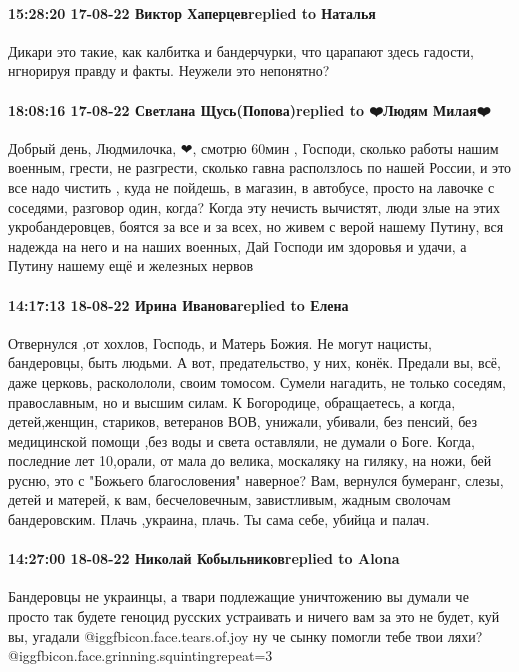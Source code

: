 \paragraph{15:28:20 17-08-22 Виктор Хаперцевreplied to Наталья}

Дикари это такие, как калбитка и бандерчурки, что царапают здесь гадости, нгнорируя правду и факты.
Неужели это непонятно?

\paragraph{18:08:16 17-08-22 Светлана Щусь(Попова)replied to ❤️Людям Милая❤️}

Добрый день, Людмилочка, ❤, смотрю 60мин , Господи, сколько работы нашим
военным, грести, не разгрести, сколько гавна расползлось по нашей России, и это
все надо чистить , куда не пойдешь, в магазин, в автобусе, просто на лавочке с
соседями, разговор один, когда? Когда эту нечисть вычистят, люди злые на этих
укробандеровцев, боятся за все и за всех, но живем с верой нашему Путину, вся
надежда на него и на наших военных, Дай Господи им здоровья и удачи, а Путину
нашему ещё и железных нервов

\paragraph{14:17:13 18-08-22 Ирина Ивановаreplied to Елена}

Отвернулся ,от хохлов, Господь, и Матерь Божия. Не могут нацисты, бандеровцы,
быть людьми. А вот, предательство, у них, конёк. Предали вы, всё, даже церковь,
расколололи, своим томосом. Сумели нагадить, не только соседям, православным,
но и высшим силам. К Богородице, обращаетесь, а когда, детей,женщин, стариков,
ветеранов ВОВ, унижали, убивали, без пенсий, без медицинской помощи ,без воды и
света оставляли, не думали о Боге. Когда, последние лет 10,орали, от мала до
велика, москаляку на гиляку, на ножи, бей русню, это с "Божьего благословения"
наверное? Вам, вернулся бумеранг, слезы, детей и матерей, к вам, бесчеловечным,
завистливым, жадным сволочам бандеровским. Плачь ,украина, плачь. Ты сама себе,
убийца и палач.

\paragraph{14:27:00 18-08-22 Николай Кобыльниковreplied to Alona}

Бандеровцы не украинцы, а твари подлежащие уничтожению вы думали че просто так
будете геноцид русских устраивать и ничего вам за это не будет, куй вы,
угадали @igg{fbicon.face.tears.of.joy}  ну че сынку помогли тебе твои ляхи?  @igg{fbicon.face.grinning.squinting}{repeat=3} 

